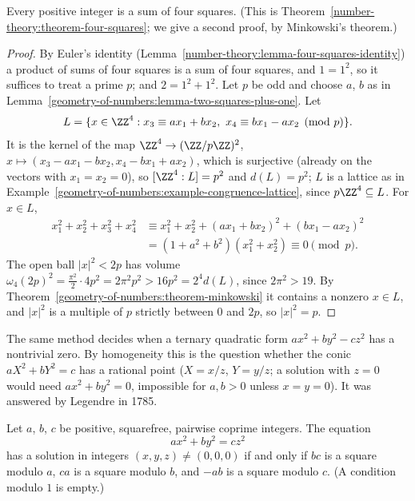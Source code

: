 \begin{theorem}[Lagrange]\label{geometry-of-numbers:theorem-four-squares}
Every positive integer is a sum of four squares. (This is Theorem~\ref{number-theory:theorem-four-squares}; we give a second proof, by Minkowski's theorem.)
\end{theorem}

\begin{proof}
By Euler's identity (Lemma~\ref{number-theory:lemma-four-squares-identity}) a product of sums of four squares is a sum of four squares, and $1 = 1^2$, so it suffices to treat a prime $p$; and
$2 = 1^2 + 1^2$. Let $p$ be odd and choose $a$, $b$ as in Lemma~\ref{geometry-of-numbers:lemma-two-squares-plus-one}. Let
\[
L = \{x \in \ZZ^4 : x_3 \equiv ax_1 + bx_2, \ x_4 \equiv bx_1 - ax_2 \pmod p\}.
\]
It is the kernel of the map $\ZZ^4 \to (\ZZ/p\ZZ)^2$, $x \mapsto (x_3 - ax_1 - bx_2, x_4 - bx_1 + ax_2)$, which is surjective (already on the vectors with $x_1 = x_2 = 0$), so $[\ZZ^4 : L] = p^2$ and
$d(L) = p^2$; $L$ is a lattice as in Example~\ref{geometry-of-numbers:example-congruence-lattice}, since $p\ZZ^4 \subseteq L$. For $x \in L$,
\[
\begin{aligned}
x_1^2 + x_2^2 + x_3^2 + x_4^2 &\equiv x_1^2 + x_2^2 + (ax_1 + bx_2)^2 + (bx_1 - ax_2)^2\\
&= (1 + a^2 + b^2)(x_1^2 + x_2^2) \equiv 0 \pmod p.
\end{aligned}
\]
The open ball $|x|^2 < 2p$ has volume $\omega_4(2p)^2 = \frac{\pi^2}{2}\cdot 4p^2 = 2\pi^2p^2 > 16p^2 = 2^4d(L)$, since $2\pi^2 > 19$. By Theorem~\ref{geometry-of-numbers:theorem-minkowski} it contains
a nonzero $x \in L$, and $|x|^2$ is a multiple of $p$ strictly between $0$ and $2p$, so $|x|^2 = p$.
\end{proof}

The same method decides when a ternary quadratic form $ax^2 + by^2 - cz^2$ has a nontrivial zero. By homogeneity this is the question whether the conic $aX^2 + bY^2 = c$ has a rational point
($X = x/z$, $Y = y/z$; a solution with $z = 0$ would need $ax^2 + by^2 = 0$, impossible for $a, b > 0$ unless $x = y = 0$). It was answered by Legendre in 1785.

\begin{theorem}[Legendre]\label{geometry-of-numbers:theorem-legendre}
Let $a$, $b$, $c$ be positive, squarefree, pairwise coprime integers. The equation
\[
ax^2 + by^2 = cz^2
\]
has a solution in integers $(x, y, z) \neq (0, 0, 0)$ if and only if $bc$ is a square modulo $a$, $ca$ is a square modulo $b$, and $-ab$ is a square modulo $c$. (A condition modulo $1$ is empty.)
\end{theorem}

